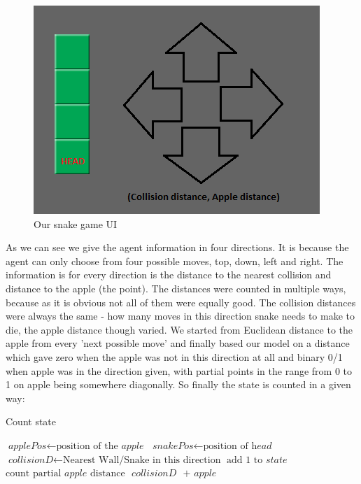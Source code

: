 \documentclass[]{article}
\begin{document}
\begin{figure}[h]
	\centering
	\includegraphics[scale=0.6]{snakeenv}
	\caption{Our snake game UI}
	\label{fig:snakeenv}
\end{figure}

\par As we can see we give the agent information in four directions. It is because the agent can only choose from four possible moves, top, down, left and right. The information is for every direction is the distance to the nearest collision and distance to the apple (the point). The distances were counted in multiple ways, because as it is obvious not all of them were equally good. The collision distances were always the same - how many moves in this direction snake needs to make to die, the apple distance though varied. We started from Euclidean distance to the apple from every 'next possible move' and finally based our model on a distance which gave zero when the apple was not in this direction at all and binary 0/1 when apple was in the direction given, with partial points in the range from 0 to 1 on apple being somewhere diagonally. So finally the state is counted in a given way:

\begin{algorithm}
	\caption{Count state}\label{euclid}
	\begin{algorithmic}[1]
		\State $\textit{applePos} \gets \text{position of the }\textit{apple}$
		\State $\textit{snakePos} \gets \text{position of }\textit{head}$
		\State $\textit{collisionD} \gets \text{Nearest Wall/Snake in this direction}$
		\EndFor
		\State $\text{add 1 to }\textit{state}$
		\EndIf
		\EndFor
		\State $\text{count partial } \textit{apple} \text{ distance }$
		\EndIf
		\Return $\textit{collisionD }\text{ + }\textit{apple}$
		\EndProcedure
	\end{algorithmic}
\end{algorithm}
\end{document}
